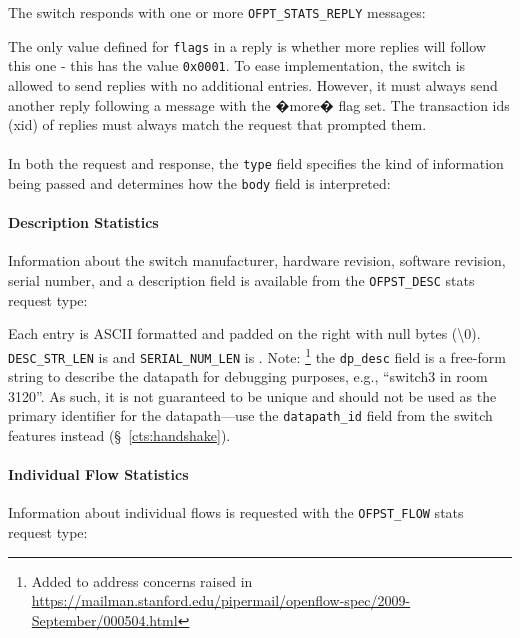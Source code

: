 
The switch responds with one or more \verb|OFPT_STATS_REPLY| messages:


The only value defined for \verb|flags| in a reply is whether more replies will follow this one - this has the value \verb|0x0001|.  To ease implementation, the switch is allowed to send replies with no additional entries.  However, it must always send another reply following a message with the �more� flag set.  The transaction ids (xid) of replies must always match the request that prompted them.
\\\\
In both the request and response, the \verb|type| field specifies the kind of information being passed and determines how the \verb|body| field is interpreted:



\paragraph{Description Statistics}
Information about the switch manufacturer, hardware revision, software revision, serial number, and a description field is available from the \verb|OFPST_DESC| stats request type:


Each entry is ASCII formatted and padded on the right with null bytes (\textbackslash0).  \verb|DESC_STR_LEN| is and \verb|SERIAL_NUM_LEN| is .  Note: \footnote{Added to address concerns raised in \url{https://mailman.stanford.edu/pipermail/openflow-spec/2009-September/000504.html}} the \verb|dp_desc| field is a free-form string to describe the datapath for debugging purposes, e.g., ``switch3 in room 3120''.  As such, it is not guaranteed to be unique and should not be used as the primary identifier for the datapath---use the \verb|datapath_id| field from the switch features instead (\S~\ref{cts:handshake}).

\paragraph{Individual Flow Statistics}
Information about individual flows is requested with the \verb|OFPST_FLOW| stats request type:

